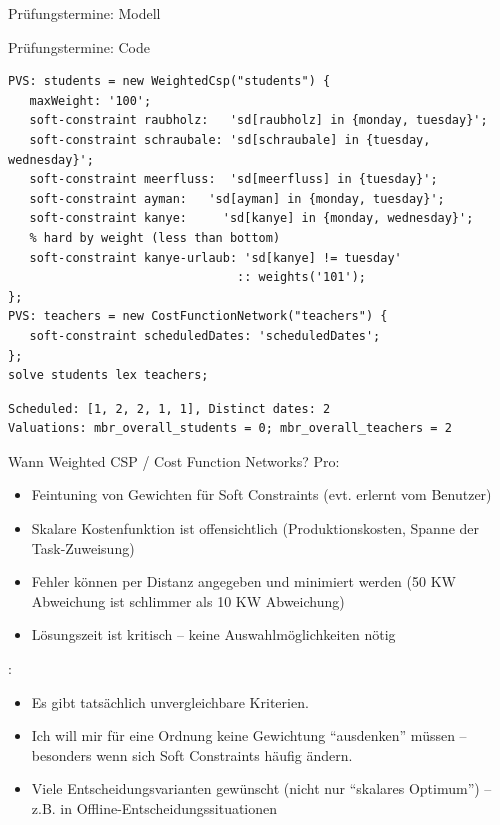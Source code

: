 \begin{frame}[fragile]{Prüfungstermine: Modell}
\end{frame}

\begin{frame}[fragile]{Prüfungstermine: Code}

\begin{lstlisting}
PVS: students = new WeightedCsp("students") {
   maxWeight: '100';
   soft-constraint raubholz:   'sd[raubholz] in {monday, tuesday}';   
   soft-constraint schraubale: 'sd[schraubale] in {tuesday, wednesday}';
   soft-constraint meerfluss:  'sd[meerfluss] in {tuesday}';
   soft-constraint ayman:   'sd[ayman] in {monday, tuesday}';
   soft-constraint kanye:     'sd[kanye] in {monday, wednesday}';
   % hard by weight (less than bottom)
   soft-constraint kanye-urlaub: 'sd[kanye] != tuesday'
                                :: weights('101'); 
}; 
PVS: teachers = new CostFunctionNetwork("teachers") {
   soft-constraint scheduledDates: 'scheduledDates';
}; 
solve students lex teachers;
\end{lstlisting}

\begin{Verbatim}[fontsize=\small]
Scheduled: [1, 2, 2, 1, 1], Distinct dates: 2
Valuations: mbr_overall_students = 0; mbr_overall_teachers = 2
\end{Verbatim}
\end{frame}

\begin{frame}{Wann Weighted CSP / Cost Function Networks?}
\alert{Pro}:

\begin{itemize}
\item Feintuning von Gewichten für Soft Constraints (evt. erlernt vom Benutzer)
\item Skalare Kostenfunktion ist offensichtlich (Produktionskosten, Spanne der Task-Zuweisung) 
\item Fehler können per Distanz angegeben und minimiert werden (50 KW Abweichung ist schlimmer als 10 KW Abweichung)
\item Lösungszeit ist kritisch -- keine Auswahlmöglichkeiten nötig
\end{itemize}

\vspace*{2ex}
:

\begin{itemize}
\item Es gibt tatsächlich unvergleichbare Kriterien.
\item Ich will mir für eine Ordnung keine Gewichtung ``ausdenken'' müssen -- besonders wenn sich Soft Constraints häufig ändern.
\item Viele Entscheidungsvarianten gewünscht (nicht nur ``skalares Optimum'') -- z.B. in Offline-Entscheidungssituationen
\end{itemize}
\end{frame}


